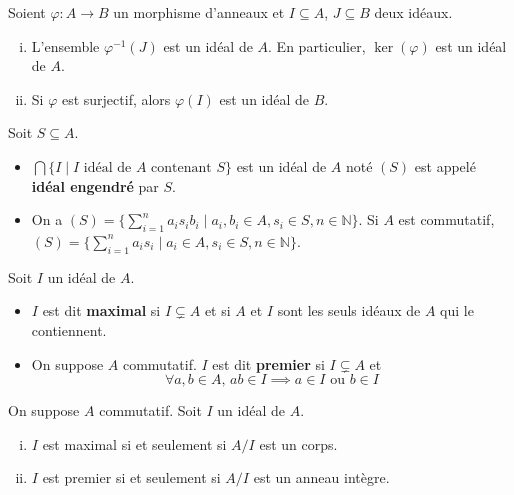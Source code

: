 	\begin{proposition}
		Soient $\varphi : A \rightarrow B$ un morphisme d'anneaux et $I \subseteq A$, $J \subseteq B$ deux idéaux.
		\begin{enumerate}[(i)]
			\item L'ensemble $\varphi^{-1}(J)$ est un idéal de $A$. En particulier, $\ker(\varphi)$ est un idéal de $A$.
			\item Si $\varphi$ est surjectif, alors $\varphi(I)$ est un idéal de $B$.
		\end{enumerate}
	\end{proposition}
	
	\begin{definition}
		Soit $S \subseteq A$.
		\begin{itemize}
			\item $\bigcap \{ I \mid I \text{ idéal de } A \text{ contenant } S \}$ est un idéal de $A$ noté $(S)$ est appelé \textbf{idéal engendré} par $S$.
			\item On a $(S) = \{ \sum_{i=1}^n a_i s_i b_i \mid a_i, b_i \in A, s_i \in S, n \in \mathbb{N} \}$. Si $A$ est commutatif, $(S) = \{ \sum_{i=1}^n a_i s_i \mid a_i \in A, s_i \in S, n \in \mathbb{N} \}$.
		\end{itemize}
	\end{definition}
	
	
	\begin{definition}
		Soit $I$ un idéal de $A$.
		\begin{itemize}
			\item $I$ est dit \textbf{maximal} si $I \subsetneq A$ et si $A$ et $I$ sont les seuls idéaux de $A$ qui le contiennent.
			\item On suppose $A$ commutatif. $I$ est dit \textbf{premier} si $I \subsetneq A$ et
			\[ \forall a, b \in A, \, ab \in I \implies a \in I \text{ ou } b \in I \]
		\end{itemize}
	\end{definition}
	
	\begin{proposition}
		On suppose $A$ commutatif. Soit $I$ un idéal de $A$.
		\begin{enumerate}[(i)]
			\item $I$ est maximal si et seulement si $A/I$ est un corps.
			\item $I$ est premier si et seulement si $A/I$ est un anneau intègre.
		\end{enumerate}
	\end{proposition}
	
